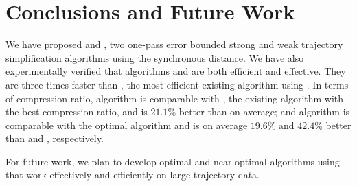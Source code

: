 \vspace{-1ex}
\section{Conclusions and Future Work}
\label{sec-conclusion}

We have proposed \cist and \cista, two one-pass error bounded strong and weak trajectory simplification algorithms using the synchronous distance.
We have also experimentally verified that algorithms \cist and \cista are both efficient and effective.
They are three times faster than \squishe, the most efficient existing \lsa algorithm using \sed.
%
In terms of compression ratio,
algorithm \cist is {comparable} with \dps, the existing \lsa algorithm with the best compression ratio, and is $21.1\%$ better than \squishe on average; and
algorithm \cista is comparable with the optimal algorithm and is on average $19.6\%$ and $42.4\%$ better than \dps and \squishe, respectively.

For future work, we plan to develop optimal and near optimal algorithms using \sed that work effectively and efficiently on large trajectory data.

